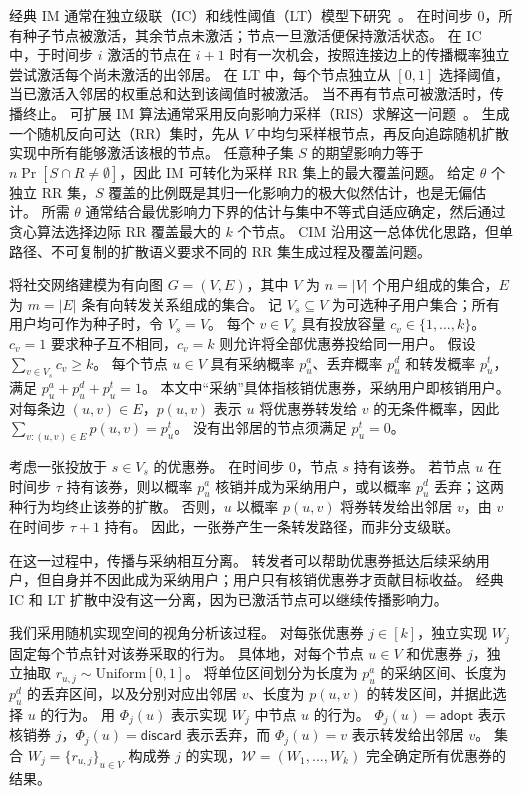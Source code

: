 \documentclass[sigconf,balance=false]{acmart}
\begin{document}
经典 IM 通常在独立级联（IC）和线性阈值（LT）模型下研究~\cite{kempe2003maximizing}。
在时间步 $0$，所有种子节点被激活，其余节点未激活；节点一旦激活便保持激活状态。
在 IC 中，于时间步 $i$ 激活的节点在 $i+1$ 时有一次机会，按照连接边上的传播概率独立尝试激活每个尚未激活的出邻居。
在 LT 中，每个节点独立从 $[0,1]$ 选择阈值，当已激活入邻居的权重总和达到该阈值时被激活。
当不再有节点可被激活时，传播终止。
可扩展 IM 算法通常采用反向影响力采样（RIS）求解这一问题~\cite{borgs2014maximizing,tang2015influence}。
生成一个随机反向可达（RR）集时，先从 $V$ 中均匀采样根节点，再反向追踪随机扩散实现中所有能够激活该根的节点。
任意种子集 $S$ 的期望影响力等于 $n\Pr[S\cap R\neq\emptyset]$，因此 IM 可转化为采样 RR 集上的最大覆盖问题。
给定 $\theta$ 个独立 RR 集，$S$ 覆盖的比例既是其归一化影响力的极大似然估计，也是无偏估计。
所需 $\theta$ 通常结合最优影响力下界的估计与集中不等式自适应确定，然后通过贪心算法选择边际 RR 覆盖最大的 $k$ 个节点。
CIM 沿用这一总体优化思路，但单路径、不可复制的扩散语义要求不同的 RR 集生成过程及覆盖问题。

将社交网络建模为有向图 $G=(V,E)$，其中 $V$ 为 $n=|V|$ 个用户组成的集合，$E$ 为 $m=|E|$ 条有向转发关系组成的集合。
记 $V_s\subseteq V$ 为可选种子用户集合；所有用户均可作为种子时，令 $V_s=V$。
每个 $v\in V_s$ 具有投放容量 $c_v\in\{1,\ldots,k\}$。
$c_v=1$ 要求种子互不相同，$c_v=k$ 则允许将全部优惠券投给同一用户。
假设 $\sum_{v\in V_s}c_v\geq k$。
每个节点 $u\in V$ 具有采纳概率 $p_u^a$、丢弃概率 $p_u^d$ 和转发概率 $p_u^t$，满足 $p_u^a+p_u^d+p_u^t=1$。
本文中“采纳”具体指核销优惠券，采纳用户即核销用户。
对每条边 $(u,v)\in E$，$p(u,v)$ 表示 $u$ 将优惠券转发给 $v$ 的无条件概率，因此 $\sum_{v:(u,v)\in E}p(u,v)=p_u^t$。
没有出邻居的节点须满足 $p_u^t=0$。

考虑一张投放于 $s\in V_s$ 的优惠券。
在时间步 $0$，节点 $s$ 持有该券。
若节点 $u$ 在时间步 $\tau$ 持有该券，则以概率 $p_u^a$ 核销并成为采纳用户，或以概率 $p_u^d$ 丢弃；这两种行为均终止该券的扩散。
否则，$u$ 以概率 $p(u,v)$ 将券转发给出邻居 $v$，由 $v$ 在时间步 $\tau+1$ 持有。
因此，一张券产生一条转发路径，而非分支级联。

在这一过程中，传播与采纳相互分离。
转发者可以帮助优惠券抵达后续采纳用户，但自身并不因此成为采纳用户；用户只有核销优惠券才贡献目标收益。
经典 IC 和 LT 扩散中没有这一分离，因为已激活节点可以继续传播影响力。

我们采用随机实现空间的视角分析该过程。
对每张优惠券 $j\in[k]$，独立实现 $W_j$ 固定每个节点针对该券采取的行为。
具体地，对每个节点 $u\in V$ 和优惠券 $j$，独立抽取 $r_{u,j}\sim\mathrm{Uniform}[0,1]$。
将单位区间划分为长度为 $p_u^a$ 的采纳区间、长度为 $p_u^d$ 的丢弃区间，以及分别对应出邻居 $v$、长度为 $p(u,v)$ 的转发区间，并据此选择 $u$ 的行为。
用 $\Phi_j(u)$ 表示实现 $W_j$ 中节点 $u$ 的行为。
$\Phi_j(u)=\textsf{adopt}$ 表示核销券 $j$，$\Phi_j(u)=\textsf{discard}$ 表示丢弃，而 $\Phi_j(u)=v$ 表示转发给出邻居 $v$。
集合 $W_j=\{r_{u,j}\}_{u\in V}$ 构成券 $j$ 的实现，$\mathcal{W}=(W_1,\ldots,W_k)$ 完全确定所有优惠券的结果。
\end{document}
